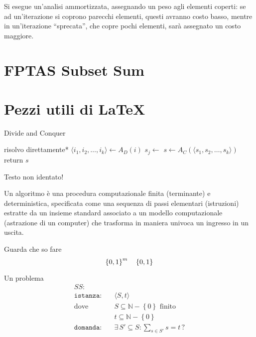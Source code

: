 Si esegue un'analisi ammortizzata, assegnando un peso agli elementi coperti: se ad un'iterazione si coprono parecchi elementi, questi avranno costo basso, mentre in un'iterazione ``sprecata'', che copre pochi elementi, sarà assegnato un costo maggiore.
\section{FPTAS Subset Sum}

\section{Pezzi utili di \LaTeX{}}
\begin{algorithm}[H]
\caption{Divide and Conquer}\label{alg:dnc}
\begin{algorithmic}[1]
            \State *risolvo direttamente*
        \EndIf
        \State $\langle i_1, i_2, \dots, i_k \rangle \gets A_D(i)$ 
            \State $s_j \gets $ 
        \EndFor
        \State $s \gets A_C(\langle s_1, s_2, \dots, s_k \rangle)$
        \State return $s$
    \EndProcedure
\end{algorithmic}
\end{algorithm}
\noindent
Testo non identato!

\begin{definition}[Algoritmo]\label{def:algex}
    Un algoritmo è una procedura computazionale finita (terminante) e deterministica, specificata come una sequenza di passi elementari (istruzioni) estratte da un insieme standard associato a un modello computazionale (astrazione di un computer) che trasforma in maniera univoca un ingresso in un uscita.
\end{definition}

Guarda che so fare
\begin{equation*}
    \left\{0,1\right\}^{m}
    \quad
    \left\{0,1\right\}^{}
\end{equation*}

Un problema
\begin{align*}
    SS: & \\
    \texttt{istanza:} \quad & \langle S,t \rangle \\
    \text{dove} \quad & S \subseteq \mathbb{N} - \left\{ 0 \right\} \text{ finito} \\
    & t \subseteq \mathbb{N} - \left\{ 0 \right\} \\
    \texttt{domanda:} \quad & \exists \, S' \subseteq S : \sum_{s \in S'}^{} s = t \, ?
\end{align*}

